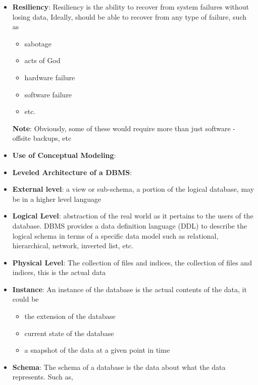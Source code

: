 \documentclass{report}
\begin{document}
\begin{itemize}
        \item \textbf{Resiliency}: Resiliency is the ability to recover from system failures without losing data, Ideally, should be able to recover from any type of failure, such as 
            \begin{itemize}
                \item sabotage
                \item acts of God
                \item hardware failure
                \item software failure
                \item etc.
            \end{itemize}
            \bigbreak \noindent 
            \textbf{Note}: Obviously, some of these would require more than just software - offsite backups, etc
        \item \textbf{Use of Conceptual Modeling}:
            \bigbreak \noindent 
        \item \textbf{Leveled Architecture of a DBMS}:
            \bigbreak \noindent 
        \item \textbf{External level}: a view or sub-schema, a portion of the logical database, may be in a higher level language
        \item \textbf{Logical Level}: abstraction of the real world as it pertains to the users of the database. DBMS provides a data definition language (DDL) to describe the logical schema in terms of a specific data model such as relational, hierarchical, network, inverted list, etc.
        \item \textbf{Physical Level}: The collection of files and indices, the collection of files and indices, this is the actual data
        \item \textbf{Instance}: An instance of the database is the actual contents of the data, it could be 
            \begin{itemize}
                \item the extension of the database
                \item current state of the database
                \item a snapshot of the data at a given point in time
            \end{itemize}
        \item \textbf{Schema}: The schema of a database is the data about what the data represents. Such as,

\end{itemize}
\end{document}
